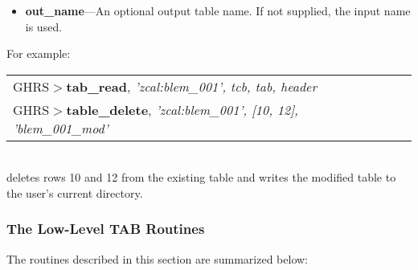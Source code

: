 \begin{description}
\begin{itemize}
\item {\bf out\_name}---An optional output table name. If not supplied, the 
input name is used.

\end{itemize}

\noindent
For example:\\

\begin{tabular}{ll}
GHRS$>${\bf tab\_read}, {\it 'zcal:blem\_001', tcb, tab, header} & \\
GHRS$>${\bf table\_delete}, {\it 'zcal:blem\_001', [10, 12], 'blem\_001\_mod'} & \\
\end{tabular}\\

\noindent
deletes rows 10 and 12 from the existing table and writes the modified table to 
the user's current directory.
\end{description}
\newpage

\subsubsection{\bf The Low-Level TAB Routines}
\label{sdas table low}

The routines 
described in this section are summarized below:\\

